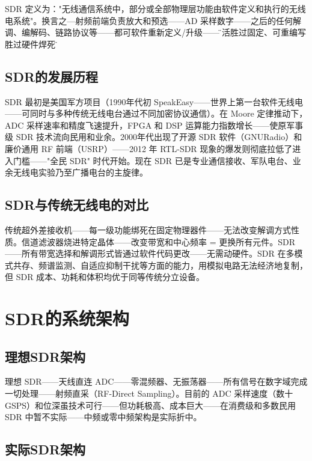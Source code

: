 \documentclass[12pt,UTF8]{ctexbook}
\begin{document}
SDR 定义为："无线通信系统中，部分或全部物理层功能由软件定义和执行的无线电系统"。换言之—射频前端负责放大和预选——AD 采样数字——之后的任何解调、编解码、链路协议等——都可软件重新定义/升级——\"灵活胜过固定、可重编写胜过硬件焊死\"。

\subsection{SDR的发展历程}

SDR 最初是美国军方项目（1990年代初 SpeakEasy——世界上第一台软件无线电——可同时与多种传统无线电台通过不同加密协议通信）。在 Moore 定律推动下，ADC 采样速率和精度飞速提升，FPGA 和 DSP 运算能力指数增长——使原军事级 SDR 技术流向民用和业余。2000年代出现了开源 SDR 软件（GNURadio）和廉价通用 RF 前端（USRP）——2012 年 RTL-SDR 现象的爆发则彻底拉低了进入门槛——"全民 SDR" 时代开始。现在 SDR 已是专业通信接收、军队电台、业余无线电实验乃至广播电台的主旋律。

\subsection{SDR与传统无线电的对比}

传统超外差接收机——每一级功能绑死在固定物理器件——无法改变解调方式性质。信道滤波器烧进特定晶体——改变带宽和中心频率 = 更换所有元件。SDR——所有带宽选择和解调形式皆通过软件代码更改——无需动硬件。SDR 在多模式共存、频谱监测、自适应抑制干扰等方面的能力，用模拟电路无法经济地复制，但 SDR 成本、功耗和体积均优于同等传统分立设备。

\section{SDR的系统架构}
\label{sec:sdr_architecture}

\subsection{理想SDR架构}

理想 SDR——天线直连 ADC——零混频器、无振荡器——所有信号在数字域完成一切处理——射频直采（RF-Direct Sampling）。目前的 ADC 采样速度（数十 GSPS）和位深虽技术可行——但功耗极高、成本巨大——在消费级和多数民用 SDR 中暂不实际——中频或零中频架构是实际折中。

\subsection{实际SDR架构}
\end{document}

